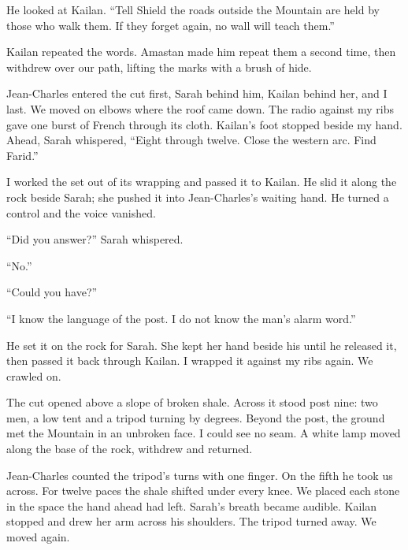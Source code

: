 He looked at Kailan. ``Tell Shield the roads outside the Mountain are held by those who walk them. If they forget again, no wall will teach them.''\par

Kailan repeated the words. Amastan made him repeat them a second time, then withdrew over our path, lifting the marks with a brush of hide.\par

Jean-Charles entered the cut first, Sarah behind him, Kailan behind her, and I last. We moved on elbows where the roof came down. The radio against my ribs gave one burst of French through its cloth. Kailan's foot stopped beside my hand. Ahead, Sarah whispered, ``Eight through twelve. Close the western arc. Find Farid.''\par

I worked the set out of its wrapping and passed it to Kailan. He slid it along the rock beside Sarah; she pushed it into Jean-Charles's waiting hand. He turned a control and the voice vanished.\par

``Did you answer?'' Sarah whispered.\par

``No.''\par

``Could you have?''\par

``I know the language of the post. I do not know the man's alarm word.''\par

He set it on the rock for Sarah. She kept her hand beside his until he released it, then passed it back through Kailan. I wrapped it against my ribs again. We crawled on.\par

The cut opened above a slope of broken shale. Across it stood post nine: two men, a low tent and a tripod turning by degrees. Beyond the post, the ground met the Mountain in an unbroken face. I could see no seam. A white lamp moved along the base of the rock, withdrew and returned.\par

Jean-Charles counted the tripod's turns with one finger. On the fifth he took us across. For twelve paces the shale shifted under every knee. We placed each stone in the space the hand ahead had left. Sarah's breath became audible. Kailan stopped and drew her arm across his shoulders. The tripod turned away. We moved again.\par

